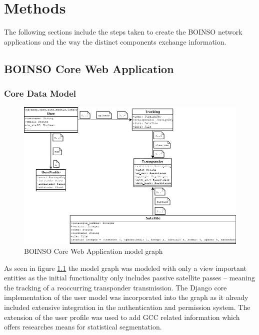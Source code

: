 \documentclass[BachelorPaper]{subfiles}
\begin{document}
\chapter{Methods}
The following sections include the steps taken to create the BOINSO network applications and the way the distinct components exchange information.

\section{BOINSO Core Web Application}
\label{sec:methods_boinso_core}

\subsection{Core Data Model}
\label{subsec:methods_core_model}

\begin{figure}[!htbp]
\centering
\includegraphics[width=0.9\linewidth]{PICs/diagrams/boinso_core_models.png}
\caption{BOINSO Core Web Application model graph}\label{fig:boinso_core_models}
\end{figure}

As seen in figure \ref{fig:boinso_core_models} the model graph was modeled with only a view important entities as the initial functionality only includes passive satellite passes --  meaning the tracking of a reoccurring transponder transmission. The Django core implementation of the user model was incorporated into the graph as it already included extensive integration in the authentication and permission system. The extension of the user profile was used to add \ac{GCC} related information which offers researches means for statistical segmentation.\\
\end{document}
